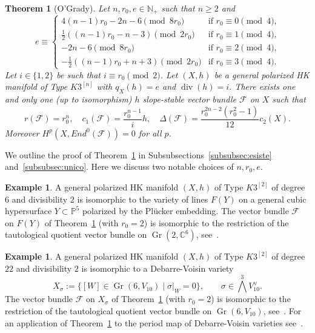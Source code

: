 \documentclass[11pt]{amsart}
\newcommand{\CC}{{\mathbb C}}
\newcommand{\NN}{{\mathbb N}}
\newcommand{\PP}{{\mathbb P}}
\let\mathcal\mathscr
\def\cF{\mathcal{F}}
\DeclareMathOperator{\divisore}{div}
\DeclareMathOperator{\Gr}{Gr}
\newtheorem{thm}[lmm]{Theorem}
\theoremstyle{definition}
\newtheorem{expl}[lmm]{Example}
\theoremstyle{remark}
\begin{document}
\begin{thm}[O'Grady]\label{thm:rigidisuk3n}
%
Let $n,r_0,e\in\NN_{+}$ such that $n\ge 2$ and 
%
\begin{equation}\label{econ}
%
e\equiv
%
\begin{cases}
%
4(n-1)r_0-2n-6 \pmod{8r_0} & \text{if $r_0\equiv 0 \pmod{4}$,} \\
%
\frac{1}{2}((n-1)r_0-n-3) \pmod{2r_0} & \text{if $r_0\equiv 1 \pmod{4}$,} \\
%
-2n-6 \pmod{8r_0}  & \text{if $r_0\equiv 2 \pmod{4}$,} \\
%
-\frac{1}{2}((n-1)r_0+n+3) \pmod{2r_0}  & \text{if $r_0\equiv 3 \pmod{4}$.}
%
\end{cases}
%
\end{equation}
%
Let $i\in\{1,2\}$ be such that $i\equiv r_0\pmod{2}$. Let $(X,h)$ be a general polarized HK manifold of Type $K3^{[n]}$ with $q_X(h)=e$ and $\divisore(h)=i$. 
There exists one and only one (up to isomorphism) $h$ slope-stable vector bundle $\cF$ on $X$ such that
 \begin{equation}\label{chernvbe}
%
r(\cF)=r_0^n,\quad c_1(\cF)=\frac{r_0^{n-1}}{i} h,\quad \Delta(\cF)  =  \frac{r_0^{2n-2}(r_0^2-1)}{12}c_2(X). 
%
\end{equation}
%
Moreover  $H^p(X,End^0(\cF))=0$ for all $p$. 
%
\end{thm}
%
We outline the proof of Theorem~\ref{thm:rigidisuk3n} in Subsubsections~\ref{subsubsec:esiste} and~\ref{subsubsec:unico}. Here we discuss two notable choices of $n,r_0,e$. 
%
\begin{expl}\label{expl:cubicadim4}
%
 A  general polarized HK manifold  $(X,h)$ of Type $K3^{[2]}$ of degree $6$ and divisibility $2$ is isomorphic to the variety of lines $F(Y)$ on a general cubic hypersurface  $Y\subset\PP^5$ polarized by the Pl\"ucker embedding. The vector bundle $\cF$  on $F(Y)$ of 
Theorem~\ref{thm:rigidisuk3n} (with $r_0=2$) is isomorphic to the restriction  of the tautological quotient vector bundle on $\Gr(2,\CC^6)$, 
see~\cite[Sect.~8]{og:fascimod}.  
%
\end{expl}
%
%
\begin{expl}\label{expl:debvoi4}
%
 A general polarized HK manifold  $(X,h)$ of Type $K3^{[2]}$ of degree $22$ and divisibility $2$ is isomorphic to a Debarre-Voisin variety 
\begin{equation}\label{eqDV}
%
X_\sigma:=\{[W]\in \Gr(6,V_{10}) \mid \sigma\vert_{ W}=0\},\qquad \sigma\in \bigwedge^3 V_{10}^\vee.
%
\end{equation}
%
 The vector bundle $\cF$ on $X_\sigma$ of Theorem~\ref{thm:rigidisuk3n} (with $r_0=2$) is isomorphic to the restriction  of the tautological quotient vector bundle on 
 $\Gr(6,V_{10})$, see~\cite[Sect.~8]{og:fascimod}.  For an application of Theorem~\ref{thm:rigidisuk3n} to the 
period map of Debarre-Voisin varieties see~\cite[Thm.~1.8]{og:fascimod}.
%
\end{expl}
%
\end{document}
